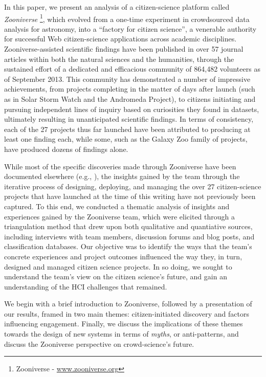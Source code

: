 \documentclass{sigchi}
\begin{document}
In this paper, we present an analysis of a citizen-science platform called \emph{Zooniverse} \footnote{Zooniverse - \url{www.zooniverse.org}}, which evolved from a one-time experiment in crowdsourced data analysis for astronomy, into a ``factory for citizen science'', a venerable authority for successful Web citizen-science applications across academic disciplines. Zooniverse-assisted scientific findings have been published in over 57 journal articles within both the natural sciences and the humanities, through the sustained effort of a dedicated and efficacious community of 864,482 volunteers as of September 2013.  This community has demonstrated a number of impressive achievements, from projects completing in the matter of days after launch (such as in Solar Storm Watch and the Andromeda Project), to citizens initiating and pursuing independent lines of inquiry based on curiosities they found in datasets, ultimately resulting in unanticipated scientific findings.  In terms of consistency, each of the 27 projects thus far launched have been attributed to producing at least one finding each, while some, such as the Galaxy Zoo family of projects, have produced dozens of findings alone.

While most of the specific discoveries made through Zooniverse have been documented elsewhere (e.g., \cite{lintott2008galaxy,lintott2009galaxy,story-of-the-peas,simpson2013dynamic}), the insights gained by the team through the iterative process of designing, deploying, and managing the over 27 citizen-science projects that have launched at the time of this writing have not previously been captured. To this end, we conducted a thematic analysis of insights and experiences gained by the Zooniverse team, which were elicited through a triangulation method that drew upon both qualitative and quantiative sources, including interviews with team members, discussion forums and blog posts, and classification databases.  Our objective was to identify the ways that the team's concrete experiences and project outcomes influenced the way they, in turn, designed and managed citizen science projects.  In so doing, we sought to understand the team's view on the citizen science's future, and gain an understanding of the HCI challenges that remained.


We begin with a brief introduction to Zooniverse, followed by a presentation of our results, framed in two main themes: citizen-initiated discovery and factors influencing engagement.  Finally, we discuss the implications of these themes towards the design of new systems in terms of \emph{myths}, or anti-patterns, and discuss the Zooniverse perspective on crowd-science's future.
\end{document}
